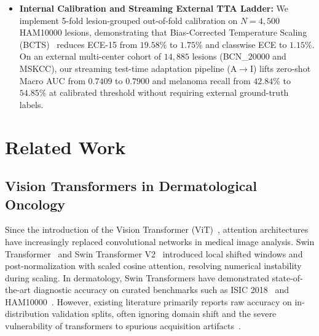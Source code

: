 \documentclass[11pt,a4paper]{article}
\begin{document}
\begin{itemize}
    \item \textbf{Internal Calibration and Streaming External TTA Ladder:} We implement 5-fold lesion-grouped out-of-fold calibration on $N=4,500$ HAM10000 lesions, demonstrating that Bias-Corrected Temperature Scaling (BCTS)~\cite{alexandari2020maximum} reduces ECE-15 from $19.58\%$ to $1.75\%$ and classwise ECE to $1.15\%$. On an external multi-center cohort of $14,885$ lesions (BCN\_20000 and MSKCC), our streaming test-time adaptation pipeline (A$\rightarrow$I) lifts zero-shot Macro AUC from $0.7409$ to $0.7900$ and melanoma recall from $42.84\%$ to $54.85\%$ at calibrated threshold without requiring external ground-truth labels.
\end{itemize}

\section{Related Work}
\label{sec:related_work}

\subsection{Vision Transformers in Dermatological Oncology}
Since the introduction of the Vision Transformer (ViT)~\cite{dosovitskiy2020image}, attention architectures have increasingly replaced convolutional networks in medical image analysis. Swin Transformer~\cite{liu2021swin} and Swin Transformer V2~\cite{liu2022swinv2} introduced local shifted windows and post-normalization with scaled cosine attention, resolving numerical instability during scaling. In dermatology, Swin Transformers have demonstrated state-of-the-art diagnostic accuracy on curated benchmarks such as ISIC 2018~\cite{codella2019skin} and HAM10000~\cite{tschandl2018ham10000}. However, existing literature primarily reports raw accuracy on in-distribution validation splits, often ignoring domain shift and the severe vulnerability of transformers to spurious acquisition artifacts~\cite{bissoto2019constructing, winkler2019association}.
\end{document}
